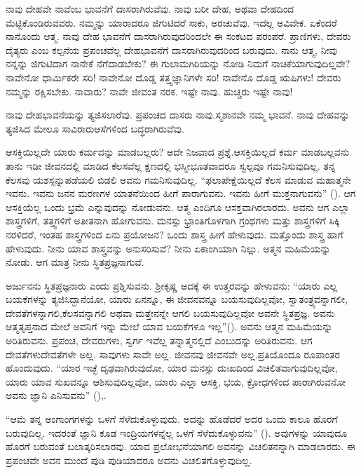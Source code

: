 ನಾವು ದೇಹವೇ ನಾವೆಂಬ ಭಾವನೆಗೆ ದಾಸರಾಗಿರುವೆವು. ನಾವು ಬರೀ ದೇಹ, ಅಥವಾ ದೇಹದಿಂದ ಮೆಟ್ಟಿಕೊಂಡಿರುವವರು. ನಮ್ಮನ್ನು ಯಾರಾದರೂ ಜಿಗುಟಿದರೆ ಸಾಕು, ಅರಚುವೆವು. ಇದೆಲ್ಲ ಅವಿವೇಕ. ಏಕೆಂದರೆ ನಾನೊಂದು ಆತ್ಮ. ನಾವು ದೇಹ ಭಾವನೆಗೆ ದಾಸರಾಗಿರುವುದರಿಂದಲೇ ಈ ಸಂಕಟದ ಪರಂಪರೆ. ಪ್ರಾಣಿಗಳು, ದೇವರು ದೈತ್ಯರು ಎಂಬ ಕಲ್ಪನೆಯ ಪ್ರಪಂಚವೆಲ್ಲ ದೇಹಭಾವನೆಗೆ ದಾಸರಾಗಿರುವುದರಿಂದ ಬರುವುದು. ನಾನು ಆತ್ಮ, ನೀವು ನನ್ನನ್ನು ಜಿಗುಟಿದಾಗ ನಾನೇಕೆ ನೆಗೆದಾಡಬೇಕು? ಈ ಗುಲಾಮಗಿರಿಯನ್ನು ನೋಡಿ ನಿಮಗೆ ನಾಚಿಕೆಯಾಗುವುದಿಲ್ಲವೇ? ನಾವೇನೋ ಧಾರ್ಮಿಕರೇ ಸರಿ! ನಾವೇನೋ ದೊಡ್ಡ ತತ್ತ್ವಜ್ಞಾನಿಗಳೇ ಸರಿ! ನಾವೇನೊ ದೊಡ್ಡ ಋಷಿಗಳು! ದೇವರು ನಮ್ಮನ್ನು ರಕ್ಷಿಸಬೇಕು. ನಾವಾರು? ನಾವೇ ಜೀವಂತ ನರಕ. ಇಷ್ಟೇ ನಾವು. ಹುಚ್ಚರು ಇಷ್ಟೇ ನಾವು!

ನಾವು ದೇಹಭಾವನೆಯನ್ನು ತ್ಯಜಿಸಲಾರೆವು. ಪ್ರಪಂಚದ ದಾಸರು ನಾವು.\break ಸ್ಮಶಾನವೇ ನಮ್ಮ ಭಾವನೆ. ನಾವು ದೇಹವನ್ನು ತ್ಯಜಿಸಿದ ಮೇಲೂ ಸಾವಿರಾರು\break ಆಸೆಗಳಿಂದ ಬದ್ಧರಾಗಿರುವೆವು.

ಆಸಕ್ತಿಯಿಲ್ಲದೇ ಯಾರು ಕರ್ಮವನ್ನು ಮಾಡಬಲ್ಲರು? ಅದೇ ನಿಜವಾದ ಪ್ರಶ್ನೆ.\break ಆಸಕ್ತಿಯಿಲ್ಲದೆ ಕರ್ಮ ಮಾಡಬಲ್ಲವನು ತಾನು ಇಡೀ ಜೀವನದಲ್ಲಿ ಮಾಡಿದ ಕೆಲಸವೆಲ್ಲ ಕ್ಷಣದಲ್ಲಿ ಭಸ್ಮೀಭೂತವಾದರೂ ಸ್ವಲ್ಪವೂ ಗಮನಿಸುವುದಿಲ್ಲ. ತನ್ನ ಕೆಲಸವು ಯಶಸ್ಸನ್ನು\break ಪಡೆಯಲಿ ಬಿಡಲಿ ಅವನು ಗಮನಿಸುವುದಿಲ್ಲ. “ಫಲಾಪೇಕ್ಷೆಯಿಲ್ಲದೆ ಕೆಲಸ ಮಾಡುವ ಮಹಾತ್ಮನೇ ಇವನು. ಇವನು ಜನನ ಮರಣಗಳ ಯಾತನೆಯಿಂದ ಹೀಗೆ ಪಾರಾಗುವನು. ಇವನು ಹೀಗೆ ಮುಕ್ತನಾಗುವನು” (). ಆಗ ಆಸಕ್ತಿಯೆಲ್ಲ ಒಂದು ಭ್ರಮೆ ಎನ್ನುವುದನ್ನು ನೋಡುವನು. ಆತ್ಮ ಎಂದಿಗೂ ಆಸಕ್ತವಾಗಿರಲಾರದು. ಅವನು ಆಗ ಎಲ್ಲಾ ಶಾಸ್ತ್ರಗಳಿಗೆ, ತತ್ತ್ವಗಳಿಗೆ ಅತೀತನಾಗಿ ಹೋಗುವನು. ಮನಸ್ಸು ಭ್ರಾಂತಿಗೊಳಗಾಗಿ ಗ್ರಂಥಗಳು ಮತ್ತು ಶಾಸ್ತ್ರಗಳಿಗೆ ಸಿಕ್ಕಿ ನರಳಿದರೆ, ಇಂತಹ ಶಾಸ್ತ್ರಗಳಿಂದ ಏನು ಪ್ರಯೋಜನ? ಒಂದು ಶಾಸ್ತ್ರ ಹೀಗೆ ಹೇಳುವುದು. ಮತ್ತೊಂದು ಶಾಸ್ತ್ರ ಹಾಗೆ ಹೇಳುವುದು. ನೀನು ಯಾವ ಶಾಸ್ತ್ರವನ್ನು ಅನುಸರಿಸುವೆ? ನೀನು ಏಕಾಂಗಿಯಾಗಿ ನಿಲ್ಲು. ಆತ್ಮನ ಮಹಿಮೆಯನ್ನು ನೋಡು. ಆಗ ಮಾತ್ರ ನೀನು ಸ್ಥಿತಪ್ರಜ್ಞನಾಗುವೆ.

ಅರ್ಜುನನು ಸ್ಥಿತಪ್ರಜ್ಞನಾರು ಎಂದು ಪ್ರಶ್ನಿಸುವನು. ಶ‍್ರೀಕೃಷ್ಣ ಅದಕ್ಕೆ ಈ ಉತ್ತರವನ್ನು ಹೇಳುವನು: “ಯಾರು ಎಲ್ಲ ಬಯಕೆಗಳನ್ನು ತ್ಯಜಿಸಿದ್ದಾನೆಯೋ, ಯಾರು ಏನನ್ನೂ, ಈ ಜೀವನವನ್ನೂ ಬಯಸುವುದಿಲ್ಲವೋ, ಸ್ವಾತಂತ್ರ್ಯವನ್ನಾಗಲೀ, ದೇವತೆಗಳನ್ನಾಗಲಿ,\break ಕೆಲಸವನ್ನಾಗಲಿ ಅಥವಾ ಮತ್ತೇನನ್ನೇ ಆಗಲಿ ಬಯಸುವುದಿಲ್ಲವೋ ಅವನೇ ಸ್ಥಿತಪ್ರಜ್ಞ. ಅವನು ಆತ್ಮತೃಪ್ತನಾದ ಮೇಲೆ ಅವನಿಗೆ ಇನ್ನು ಮೇಲೆ ಯಾವ ಬಯಕೆಗಳೂ ಇಲ್ಲ”\break (). ಅವನು ಆತ್ಮನ ಮಹಿಮೆಯನ್ನು ಅರಿತಿರುವನು. ಪ್ರಪಂಚ, ದೇವರುಗಳು, ಸ್ವರ್ಗ ಇವೆಲ್ಲ ತನ್ನಾತ್ಮನಲ್ಲಿದೆ ಎಂಬುದನ್ನು ಅರಿತಿರುವನು. ಆಗ ದೇವತೆಗಳು\break ದೇವತೆಗಳೇ ಅಲ್ಲ. ಸಾವುಗಳು ಸಾವೇ ಅಲ್ಲ. ಜೀವನವು ಜೀವನವೇ ಅಲ್ಲ.\break ಪ್ರತಿಯೊಂದೂ ರೂಪಾಂತರ ಹೊಂದುವುದು. “ಯಾರ ಇಚ್ಛೆ ದೃಢವಾಗಿರುವುದೋ, ಯಾರ ಮನಸ್ಸು ದುಃಖದಿಂದ ವಿಚಲಿತವಾಗುವುದಿಲ್ಲವೋ, ಯಾರು ಯಾವ ಸುಖವನ್ನೂ ಆಶಿಸುವುದಿಲ್ಲವೋ, ಯಾರು ಎಲ್ಲಾ ಆಸಕ್ತಿ, ಭಯ, ಕ್ರೋಧಗಳಿಂದ ಪಾರಾಗಿರುವನೋ ಅವನು ಜ್ಞಾನಿ ಎನಿಸುವನು” (),.

“ಆಮೆ ತನ್ನ ಅಂಗಾಂಗಗಳನ್ನು ಒಳಗೆ ಸೆಳೆದುಕೊಳ್ಳುವುದು. ಅದನ್ನು ಹೊಡೆದರೆ ಅದರ ಒಂದು ಕಾಲೂ ಹೊರಗೆ ಬರುವುದಿಲ್ಲ. ಇದರಂತೆ ಜ್ಞಾನಿ ಕೂಡ ಇಂದ್ರಿಯಗಳನ್ನೆಲ್ಲ ಒಳಗೆ ಸೆಳೆದುಕೊಳ್ಳುವನು” (). ಅವುಗಳನ್ನು ಯಾವುದೂ ಹೊರಗೆ ಬರುವಂತೆ ಬಲಾತ್ಕರಿಸಲಾರವು. ಯಾವ ಪ್ರಲೋಭನೆಯಾಗಲಿ ಅವನನ್ನು ವಿಚಲಿತನನ್ನಾಗಿ ಮಾಡಲಾರದು. ಈ ಪ್ರಪಂಚವೇ ಅವನ ಮುಂದೆ ಪುಡಿ ಪುಡಿಯಾದರೂ ಅವನು ವಿಚಲಿತಗೊಳ್ಳುವುದಿಲ್ಲ.

